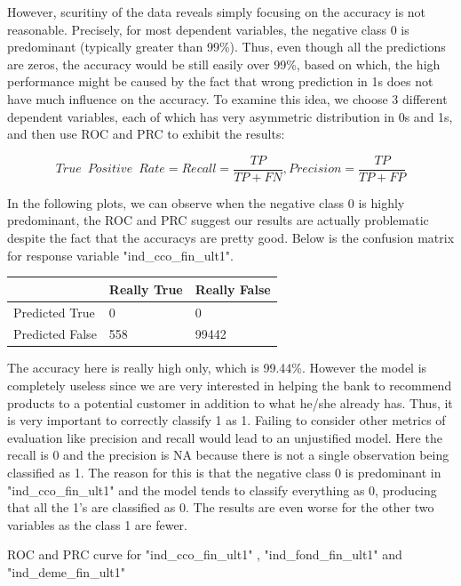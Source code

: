 \documentclass{article}
\begin{document}
However, scuritiny of the data reveals simply focusing on the accuracy is not reasonable. Precisely, for most dependent variables, the negative class 0 is predominant (typically greater than 99\%). Thus, even though all the predictions are zeros, the accuracy would be still easily over 99\%, based on which, the high performance might be caused by the fact that wrong prediction in 1s does not have much influence on the accuracy. To examine this idea, we choose 3 different dependent variables, each of which has very asymmetric distribution in 0s and 1s, and then use ROC and PRC to exhibit the results:

$$True\enspace Positive\enspace Rate = Recall = \frac{TP}{TP+FN}, Precision = \frac{TP}{TP+FP}$$

In the following plots, we can observe when the negative class 0 is highly predominant, the ROC and PRC suggest our results are actually problematic despite the fact that the accuracys are pretty good. Below is the confusion matrix for response variable "ind\_cco\_fin\_ult1".

\vspace{5mm}
\begin{tabular}{| l | l | l |}
\hline
  & Really True & Really False \\ \hline
Predicted True & 0 & 0 \\ \hline
Predicted False & 558 & 99442\\
\hline
\end{tabular}
\vspace{5mm}

The accuracy here is really high only, which is 99.44\%. However the model is completely useless since we are very interested in helping the bank to recommend products to a potential customer in addition to what he/she already has. Thus, it is very important to correctly classify 1 as 1. Failing to consider other metrics of evaluation like precision and recall would lead to an unjustified model. Here the recall is 0 and the precision is NA because there is not a single observation being classified as 1. The reason for this is that the negative class 0 is predominant in "ind\_cco\_fin\_ult1" and the model tends to classify everything as 0, producing that all the 1’s are classified as 0. The results are even worse for the other two variables as the class 1 are fewer.

ROC and PRC curve for "ind\_cco\_fin\_ult1" , "ind\_fond\_fin\_ult1" and "ind\_deme\_fin\_ult1" 
\end{document}

